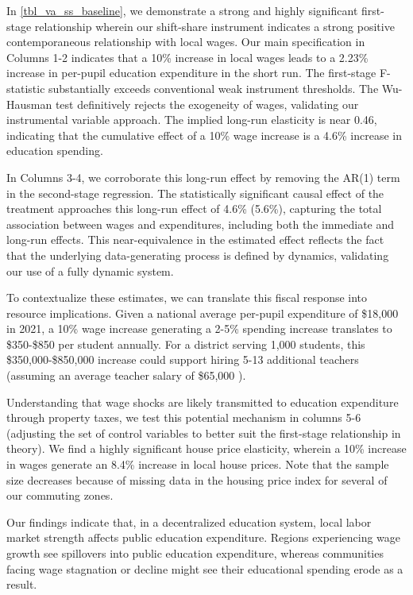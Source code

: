 \documentclass[
  10pt,
]{article}
\begin{document}
In \autoref{tbl_va_ss_baseline}, we demonstrate a strong and highly
significant first-stage relationship wherein our shift-share instrument
indicates a strong positive contemporaneous relationship with local
wages. Our main specification in Columns 1-2 indicates that a 10\%
increase in local wages leads to a 2.23\% increase in per-pupil
education expenditure in the short run. The first-stage F-statistic
substantially exceeds conventional weak instrument thresholds. The
Wu-Hausman test definitively rejects the exogeneity of wages, validating
our instrumental variable approach. The implied long-run elasticity is
near 0.46, indicating that the cumulative effect of a 10\% wage increase
is a 4.6\% increase in education spending.

In Columns 3-4, we corroborate this long-run effect by removing the
AR(1) term in the second-stage regression. The statistically significant
causal effect of the treatment approaches this long-run effect of 4.6\%
(5.6\%), capturing the total association between wages and expenditures,
including both the immediate and long-run effects. This near-equivalence
in the estimated effect reflects the fact that the underlying
data-generating process is defined by dynamics, validating our use of a
fully dynamic system.

To contextualize these estimates, we can translate this fiscal response
into resource implications. Given a national average per-pupil
expenditure of \$18,000
\autocite{nationalcenterforeducationstatistics2023} in 2021, a 10\% wage
increase generating a 2-5\% spending increase translates to \$350-\$850
per student annually. For a district serving 1,000 students, this
\$350,000-\$850,000 increase could support hiring 5-13 additional
teachers (assuming an average teacher salary of \$65,000
\autocite{nationalcenterforeducationstatistics2021}).

Understanding that wage shocks are likely transmitted to education
expenditure through property taxes, we test this potential mechanism in
columns 5-6 (adjusting the set of control variables to better suit the
first-stage relationship in theory). We find a highly significant house
price elasticity, wherein a 10\% increase in wages generate an 8.4\%
increase in local house prices. Note that the sample size decreases
because of missing data in the housing price index for several of our
commuting zones.

Our findings indicate that, in a decentralized education system, local
labor market strength affects public education expenditure. Regions
experiencing wage growth see spillovers into public education
expenditure, whereas communities facing wage stagnation or decline might
see their educational spending erode as a result.
\end{document}
